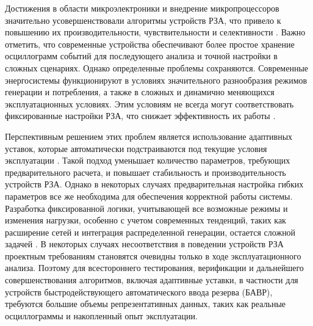 Достижения в области микроэлектроники и внедрение микропроцессоров значительно
усовершенствовали алгоритмы устройств РЗА, что привело к повышению их
производительности, чувствительности и селективности \cite{bavr_bib_064_j_2024}. Важно
отметить, что современные устройства обеспечивают более простое хранение осциллограмм
событий для последующего анализа и точной настройки в сложных сценариях. Однако
определенные проблемы сохраняются. Современные энергосистемы функционируют в условиях
значительного разнообразия режимов генерации и потребления, а также в сложных и
динамично меняющихся эксплуатационных условиях. Этим условиям не всегда могут
соответствовать фиксированные настройки РЗА, что снижает эффективность их работы
\cite{bavr_bib_065_a_2017,bavr_bib_066_h_2014,bavr_bib_067_q_2023}.\par\vspace{0.2cm}

Перспективным решением этих проблем является использование адаптивных уставок, которые
автоматически подстраиваются под текущие условия эксплуатации
\cite{bavr_bib_068_h_2011,bavr_bib_069_s_2017,bavr_bib_071_a_2022,bavr_bib_072_a_2022,bavr_bib_073_v_2023,bavr_bib_074_z_2024}.
Такой подход уменьшает количество параметров, требующих предварительного расчета, и
повышает стабильность и производительность устройств РЗА. Однако в некоторых случаях
предварительная настройка гибких параметров все же необходима для обеспечения корректной
работы системы. Разработка фиксированной логики, учитывающей все возможные режимы и
изменения нагрузки, особенно с учетом современных тенденций, таких как расширение сетей
и интеграция распределенной генерации, остается сложной задачей
\cite{bavr_bib_075_a_2023,bavr_bib_076_h_2024,bavr_bib_077_p_2024,bavr_bib_078_z_2024,bavr_bib_079_j_2025}.
В некоторых случаях несоответствия в поведении устройств РЗА проектным требованиям
становятся очевидны только в ходе эксплуатационного анализа. Поэтому для всестороннего
тестирования, верификации и дальнейшего совершенствования алгоритмов, включая адаптивные
уставки, в частности для устройств быстродействующего автоматического ввода резерва
(БАВР), требуются большие объемы репрезентативных данных, таких как реальные
осциллограммы и накопленный опыт эксплуатации.\par\vspace{0.2cm}

